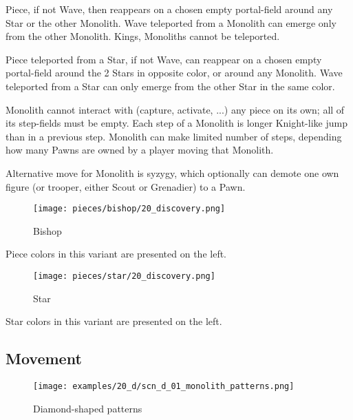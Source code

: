 Piece, if not Wave, then reappears on a chosen empty portal-field around
any Star or the other Monolith. Wave teleported from a Monolith can emerge
only from the other Monolith. Kings, Monoliths cannot be teleported.

Piece teleported from a Star, if not Wave, can reappear on a chosen empty
portal-field around the 2 Stars in opposite color, or around any Monolith.
Wave teleported from a Star can only emerge from the other Star in the same
color.

Monolith cannot interact with (capture, activate, ...) any piece on its own;
all of its step-fields must be empty. Each step of a Monolith is longer
Knight-like jump than in a previous step. Monolith can make limited number of
steps, depending how many Pawns are owned by a player moving that Monolith.

Alternative move for Monolith is syzygy, which optionally can demote one own
figure (or trooper, either Scout or Grenadier) to a Pawn.

\clearpage %

\noindent
\begin{wrapfigure}[2]{l}{0.4\textwidth}
\centering
\texttt{[image: pieces/bishop/20\_discovery.png]}
\caption{Bishop}
\label{fig:bishop/20_discovery}
\end{wrapfigure}
Piece colors in this variant are presented on the left.

\vspace*{9.7\baselineskip}
\noindent
\begin{wrapfigure}[2]{l}{0.4\textwidth}
\centering
\texttt{[image: pieces/star/20\_discovery.png]}
\caption{Star}
\label{fig:star/20_discovery}
\end{wrapfigure}
Star colors in this variant are presented on the left.

\clearpage %

\subsection*{Movement}
\label{sec:Discovery/Monolith/Movement}

\vspace*{-1.4\baselineskip}
\noindent
\begin{figure}[!h]
\texttt{[image: examples/20\_d/scn\_d\_01\_monolith\_patterns.png]}
\vspace*{-1.3\baselineskip}
\caption{Diamond-shaped patterns}
\label{fig:scn_d_01_monolith_patterns}
\end{figure}

